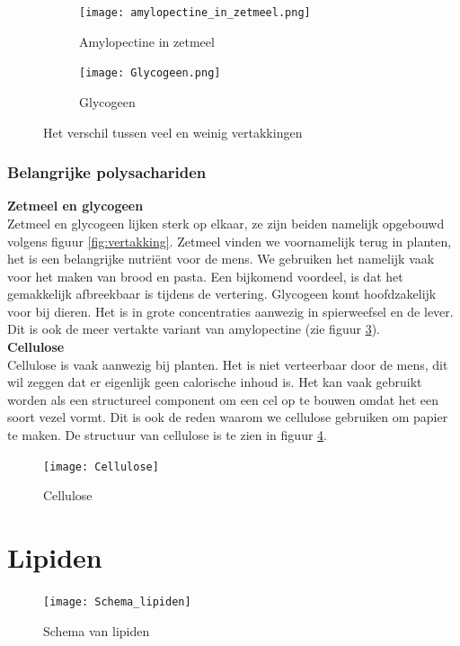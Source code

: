 \documentclass[a4paper,kul]{kulakarticle} %
\begin{document}
\begin{figure}[h]
	\centering
	\begin{subfigure}{.5\textwidth}
		\centering
		\texttt{[image: amylopectine\_in\_zetmeel.png]}
		\caption{Amylopectine in zetmeel}
		\label{fig:sub1}
	\end{subfigure}%
	\begin{subfigure}{.5\textwidth}
		\centering
		\texttt{[image: Glycogeen.png]}
		\caption{Glycogeen}
		\label{fig:sub2}
	\end{subfigure}
	\caption{Het verschil tussen veel en weinig vertakkingen}
	\label{fig:vertakkingen}
\end{figure}
\newpage
\subsubsection{Belangrijke polysachariden}
\textbf{Zetmeel en glycogeen}\\
Zetmeel en glycogeen lijken sterk op elkaar, ze zijn beiden namelijk opgebouwd volgens figuur \ref{fig:vertakking}. Zetmeel vinden we voornamelijk terug in planten, het is een belangrijke nutriënt voor de mens. We gebruiken het namelijk vaak voor het maken van brood en pasta. Een bijkomend voordeel, is dat het gemakkelijk afbreekbaar is tijdens de vertering. Glycogeen komt hoofdzakelijk voor bij dieren. Het is in grote concentraties aanwezig in spierweefsel en de lever. Dit is ook de meer vertakte variant van amylopectine (zie figuur \ref{fig:vertakkingen}).\\
\textbf{Cellulose}\\
Cellulose is vaak aanwezig bij planten. Het is niet verteerbaar door de mens, dit wil zeggen dat er eigenlijk geen calorische inhoud is. Het kan vaak gebruikt worden als een structureel component om een cel op te bouwen omdat het een soort vezel vormt. Dit is ook de reden waarom we cellulose gebruiken om papier te maken. De structuur van cellulose is te zien in figuur \ref{fig:cellulose}.
\begin{figure}[h]
	\centering
	\texttt{[image: Cellulose]}
	\caption[Cellulose]{Cellulose}
	\label{fig:cellulose}
\end{figure}

\section{Lipiden}
\begin{figure}[htbp]
	\centering
	\texttt{[image: Schema\_lipiden]}
	\caption[Lipiden]{Schema van lipiden}
	\label{fig:schemalipiden}
\end{figure}
\end{document}
